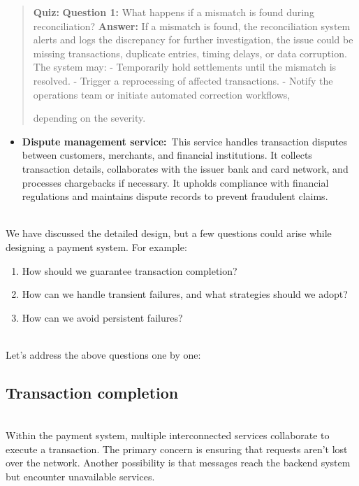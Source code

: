 \begin{quote}
\textbf{Quiz:}
\textbf{Question 1:} What happens if a mismatch is found during reconciliation?
\textbf{Answer:} If a mismatch is found, the reconciliation system alerts and logs the discrepancy for further investigation, the issue could be missing transactions, duplicate entries, timing delays, or data corruption. The system may: - Temporarily hold settlements until the mismatch is resolved. - Trigger a reprocessing of affected transactions. - Notify the operations team or initiate automated correction workflows,

depending on the severity.
\end{quote}

\begin{itemize}
\item
\protect{}\label{7yrmjexnxu3fPOnN9Aliz}
\textbf{Dispute management service:}~This service handles transaction disputes between customers, merchants, and financial institutions. It collects transaction details, collaborates with the issuer bank and card network, and processes chargebacks if necessary. It upholds compliance with financial regulations and maintains dispute records to prevent fraudulent claims.
\end{itemize}
\\
We have discussed the detailed design, but a few questions could arise while designing a payment system. For example:

\begin{enumerate}
\item
\protect{}\label{ZDr732zzNemHfjRuf6-Wa}
How should we guarantee transaction completion?
\item
\protect{}\label{F-A5fWMmUkP5aq_jIalGS}
How can we handle transient failures, and what strategies should we adopt?
\item
\protect{}\label{7cLQlK6yNYRGguojAUbFw}
How can we avoid persistent failures?
\end{enumerate}
\\
Let's address the above questions one by one:

\subsection{Transaction completion}\label{K9hcJg_zUMlZT2Fi1ssZq}
\\
Within the payment system, multiple interconnected services collaborate to execute a transaction. The primary concern is ensuring that requests aren't lost over the network. Another possibility is that messages reach the backend system but encounter unavailable services.


